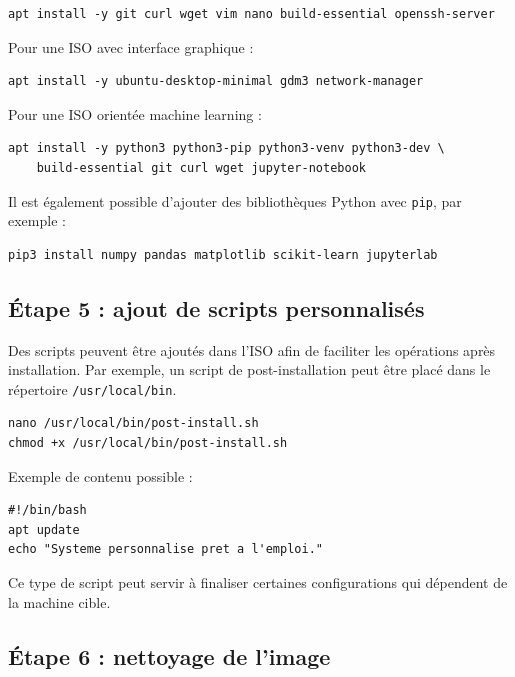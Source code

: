 \documentclass[12pt,a4paper]{article}
\begin{document}
\begin{lstlisting}
apt install -y git curl wget vim nano build-essential openssh-server
\end{lstlisting}

Pour une ISO avec interface graphique :

\begin{lstlisting}
apt install -y ubuntu-desktop-minimal gdm3 network-manager
\end{lstlisting}

Pour une ISO orientée machine learning :

\begin{lstlisting}
apt install -y python3 python3-pip python3-venv python3-dev \
    build-essential git curl wget jupyter-notebook
\end{lstlisting}

Il est également possible d'ajouter des bibliothèques Python avec \texttt{pip}, par exemple :

\begin{lstlisting}
pip3 install numpy pandas matplotlib scikit-learn jupyterlab
\end{lstlisting}

\subsection{Étape 5 : ajout de scripts personnalisés}

Des scripts peuvent être ajoutés dans l'ISO afin de faciliter les opérations après installation. Par exemple, un script de post-installation peut être placé dans le répertoire \texttt{/usr/local/bin}.

\begin{lstlisting}
nano /usr/local/bin/post-install.sh
chmod +x /usr/local/bin/post-install.sh
\end{lstlisting}

Exemple de contenu possible :

\begin{lstlisting}
#!/bin/bash
apt update
echo "Systeme personnalise pret a l'emploi."
\end{lstlisting}

Ce type de script peut servir à finaliser certaines configurations qui dépendent de la machine cible.

\subsection{Étape 6 : nettoyage de l'image}
\end{document}
